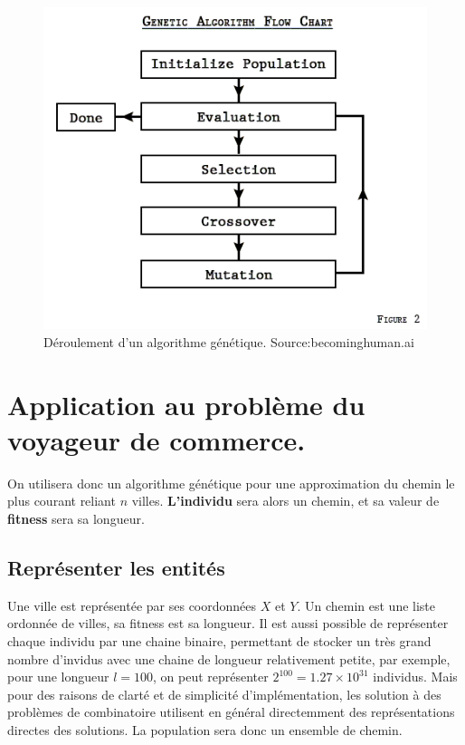 \documentclass[11pt]{article}
\begin{document}
\begin{figure}[htb]
\centering
\includegraphics[width=.9\linewidth]{./GA.png}
\caption{Déroulement d'un algorithme génétique. Source:becominghuman.ai}
\end{figure}

\section{Application au problème du voyageur de commerce.}
\label{sec-2}

On utilisera donc un algorithme génétique pour une approximation du chemin le plus courant reliant $n$ villes.
\textbf{L'individu} sera alors un chemin, et sa valeur de \textbf{fitness} sera sa longueur.   

\subsection{Représenter les entités}
\label{sec-2-1}

Une ville est représentée par ses coordonnées $X$ et $Y$.
Un chemin est une liste ordonnée de villes, sa fitness est sa longueur. Il est aussi possible de représenter chaque individu par une chaine
binaire, permettant de stocker un très grand nombre d'invidus avec une chaine de longueur relativement petite, par exemple, pour une longueur
$l = 100$, on peut représenter $2^{100} = 1.27 \times 10^{31}$ individus. Mais pour des raisons de clarté et de simplicité d'implémentation,
les solution à des problèmes de combinatoire utilisent en général directemment des représentations directes des solutions.
La population sera donc un ensemble de chemin.
\end{document}
